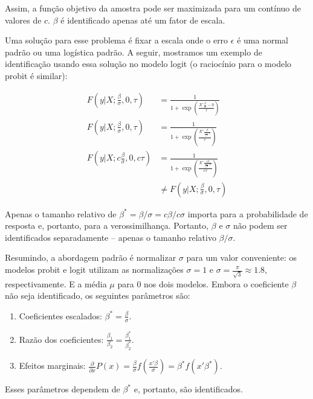 \documentclass[12pt]{article}
\theoremstyle{break}
\begin{document}
Assim, a função objetivo da amostra pode ser maximizada para um contínuo de valores de \( c \).
 \( \beta \) é identificado apenas até um fator de escala. 
 
 
Uma solução para esse problema é fixar a escala onde o erro $\epsilon$ é uma normal padrão ou uma logística padrão. A seguir, mostramos um exemplo de identificação usando essa solução no modelo logit (o raciocínio para o modelo probit é similar):


\begin{align*}
    F(y | X; \frac{\beta}{\sigma},0,\tau )  &=  \frac{1}{1 + \exp\left( \frac{ X'\frac{\beta}{\sigma} - 0}{\tau} \right)} \\
    F(y | X; \frac{\beta}{\sigma},0,\tau )  &=  \frac{1}{1 + \exp\left( \frac{ X'\frac{\beta}{\frac{\pi}{\sqrt{3}}\tau}}{\tau} \right)} \\
    F(y | X; c \frac{\beta}{\sigma},0,c\tau ) & =  \frac{1}{1 + \exp\left( \frac{ X'\frac{c\beta}{\frac{\pi}{\sqrt{3}}c\tau}}{c\tau} \right)} \\
    & \neq F(y | X; \frac{\beta}{\sigma},0,\tau )
\end{align*}



Apenas o tamanho relativo de  $\beta^* = \beta / \sigma = c\beta / c\sigma$  importa para a probabilidade de resposta e, portanto, para a verossimilhança. Portanto, \( \beta \) e \( \sigma \) não podem ser identificados separadamente – apenas o tamanho relativo \( \beta / \sigma \). 



Resumindo, a abordagem padrão é normalizar $\sigma$ para um valor conveniente: os modelos probit e logit utilizam as normalizações $\sigma = 1$ e $\sigma = \frac{\pi}{\sqrt{3}} \approx 1.8$, respectivamente. E a média $\mu$ para 0 nos dois modelos. Embora o coeficiente $\beta$ não seja identificado, os seguintes parâmetros são:

\begin{enumerate}
    \item Coeficientes escalados: $\beta^* = \frac{\beta}{\sigma}$.
    \item Razão dos coeficientes: $\frac{\beta_1}{\beta_2} = \frac{\beta^*_1}{\beta^*_2}$.
    \item Efeitos marginais: $\frac{\partial}{\partial x} P(x) = \frac{\beta}{\sigma} f\left(\frac{x'\beta}{\sigma}\right) = \beta^* f\left(x'\beta^*\right)$.
\end{enumerate}

Esses parâmetros dependem de $\beta^*$ e, portanto, são identificados.
\end{document}
